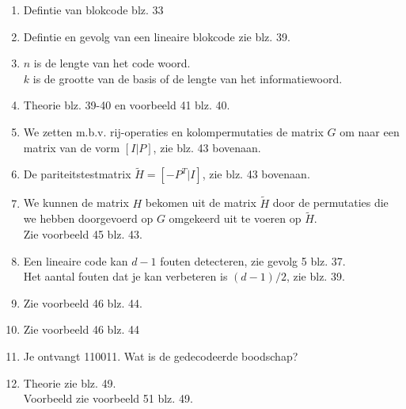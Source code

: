 \documentclass[11pt,a4paper,titlepage]{article}
\begin{document}
	\begin{enumerate}[label=(\alph*)]
	\item  Defintie van blokcode blz. 33
	\item Defintie en gevolg van een lineaire blokcode zie blz. 39.
	\item $n$ is de lengte van het code woord.\\
		$k$ is de grootte van de basis of de lengte van het informatiewoord.
	\item Theorie blz. 39-40 en voorbeeld 41 blz. 40.
	\item We zetten m.b.v. rij-operaties en kolompermutaties de matrix $G$ om naar een matrix van de vorm $[I|P]$, zie blz. 43 bovenaan.
	\item De pariteitstestmatrix $\tilde{H} = [-P^T | I]$, zie blz. 43 bovenaan.
	\item We kunnen de matrix $H$ bekomen uit de matrix $\tilde{H}$ door de permutaties die we hebben doorgevoerd op $G$ omgekeerd uit te voeren op $\tilde{H}$. \\ Zie voorbeeld 45 blz. 43.
	\item Een lineaire code kan $d - 1$ fouten detecteren, zie gevolg 5 blz. 37.\\
		Het aantal fouten dat je kan verbeteren is $(d-1)/2$, zie blz. 39.
	\item Zie voorbeeld 46 blz. 44.
	\item Zie voorbeeld 46 blz. 44
	\item Je ontvangt 110011. Wat is de gedecodeerde boodschap?
	\item Theorie zie blz. 49.\\ Voorbeeld zie voorbeeld 51 blz. 49.
	\end{enumerate}
	
\end{document}
